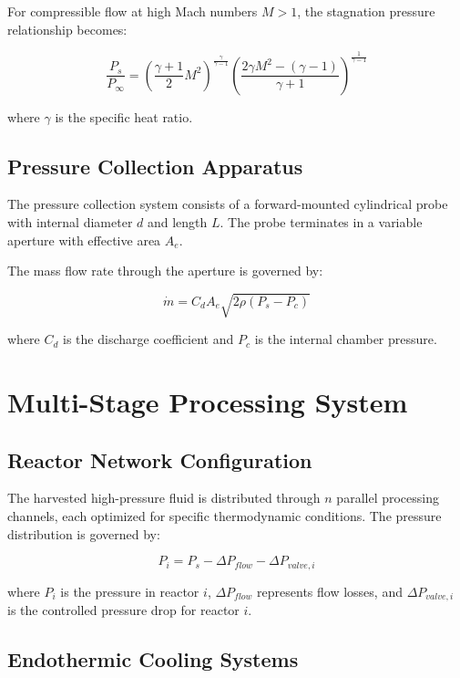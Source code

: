 \documentclass[12pt,a4paper]{article}
\begin{document}
For compressible flow at high Mach numbers $M > 1$, the stagnation pressure relationship becomes:

\begin{equation}
\frac{P_s}{P_\infty} = \left(\frac{\gamma + 1}{2}M^2\right)^{\frac{\gamma}{\gamma-1}} \left(\frac{2\gamma M^2 - (\gamma-1)}{\gamma + 1}\right)^{\frac{1}{\gamma-1}}
\end{equation}

where $\gamma$ is the specific heat ratio.

\subsection{Pressure Collection Apparatus}

The pressure collection system consists of a forward-mounted cylindrical probe with internal diameter $d$ and length $L$. The probe terminates in a variable aperture with effective area $A_e$.

The mass flow rate through the aperture is governed by:

\begin{equation}
\dot{m} = C_d A_e \sqrt{2\rho(P_s - P_c)}
\end{equation}

where $C_d$ is the discharge coefficient and $P_c$ is the internal chamber pressure.

\section{Multi-Stage Processing System}

\subsection{Reactor Network Configuration}

The harvested high-pressure fluid is distributed through $n$ parallel processing channels, each optimized for specific thermodynamic conditions. The pressure distribution is governed by:

\begin{equation}
P_i = P_s - \Delta P_{flow} - \Delta P_{valve,i}
\end{equation}

where $P_i$ is the pressure in reactor $i$, $\Delta P_{flow}$ represents flow losses, and $\Delta P_{valve,i}$ is the controlled pressure drop for reactor $i$.

\subsection{Endothermic Cooling Systems}
\end{document}

